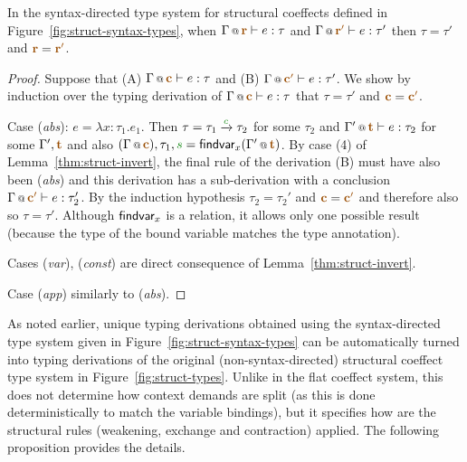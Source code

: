 \begin{theorem}
\label{thm:struct-unique}
In the syntax-directed type system for structural coeffects defined in Figure~\ref{fig:struct-syntax-types},
when $\coctx{\Gamma}{\aclrd{\textbf{r}}} \vdash e : \tau$ and
$\coctx{\Gamma}{\aclrd{\textbf{r}'}} \vdash e : \tau'$ then $\tau = \tau'$ and $\aclrd{\textbf{r}} = \aclrd{\textbf{r}'}$.
\end{theorem}
\begin{proof}
Suppose that (A) $\coctx{\Gamma}{\aclrd{\textbf{c}}} \vdash e : \tau$ and
(B) $\coctx{\Gamma}{\aclrd{\textbf{c}'}} \vdash e : \tau'$. We show by induction over the typing
derivation of $\coctx{\Gamma}{\aclrd{\textbf{c}}} \vdash e : \tau$ that $\tau = \tau'$ and $\aclrd{\textbf{c}}=\aclrd{\textbf{c}'}$.

\vspace{0.5em}\noindent\hangindent=0.6cm
Case (\emph{abs}): $e = \lambda x\!:\!\tau_1.e_1$. Then $\tau = \tau_1 \xrightarrow{\cclrd{c}} \tau_2$
  for some $\tau_2$ and $\coctx{\Gamma'}{\aclrd{\textbf{t}}} \vdash e : \tau_2$ for some $\Gamma', \aclrd{\textbf{t}}$
  and also $(\coctx{\Gamma}{\aclrd{\textbf{c}}}), \tau_1, \cclrd{s} = \ident{findvar}_x(\coctx{\Gamma'}{\aclrd{\textbf{t}}})$.
  By case (4) of Lemma~\ref{thm:struct-invert}, the final rule of the derivation (B) must
  have also been (\emph{abs}) and this derivation has a sub-derivation with a conclusion
  ${\coctx{\Gamma}{\aclrd{\textbf{c}'}} \vdash e : \tau_2'}$.
  By the induction hypothesis $\tau_2 = \tau_2'$ and $\aclrd{\textbf{c}}=\aclrd{\textbf{c}'}$ and therefore
  also so $\tau = \tau'$. Although $\textnormal{\sffamily findvar}_x$ is a relation, it allows only one possible result
  (because the type of the bound variable matches the type annotation).

\vspace{0.5em}\noindent\hangindent=0.7cm
Cases (\emph{var}), (\emph{const}) are direct consequence of Lemma~\ref{thm:struct-invert}.

\vspace{0.5em}\noindent\hangindent=0.7cm
Case (\emph{app}) similarly to (\emph{abs}).
\end{proof}

\noindent
As noted earlier, unique typing derivations obtained using the syntax-directed type system
given in Figure~\ref{fig:struct-syntax-types} can be automatically turned into typing derivations
of the original (non-syntax-directed) structural coeffect type system in Figure~\ref{fig:struct-types}.
Unlike in the flat coeffect system, this does not determine how context demands are split
(as this is done deterministically to match the variable bindings), but it specifies how are
the structural rules (weakening, exchange and contraction) applied.
The following proposition provides the details.

